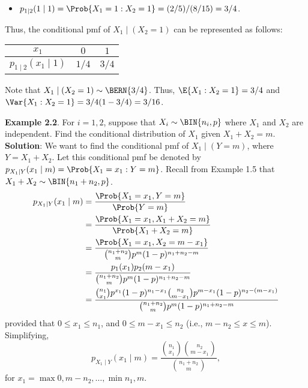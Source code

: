 \begin{Example}
\begin{itemize}
        \item $ p_{1\mid 2}(1\mid 1)=\Prob{X_1=1\given X_2=1}=(2/5)/(8/15)=3/4 $.
    \end{itemize}
    Thus, the conditional pmf of $ X_1\mid(X_2=1) $ can be
    represented as follows:
    \begin{center}
        \begin{NiceTabular}{c|cc}
            $ x_1 $ & $ 0 $ & $ 1 $\\
            \midrule
            $ p_{1\mid 2}(x_1\mid 1) $ & $ 1/4 $ & $ 3/4 $
        \end{NiceTabular}
    \end{center}
    Note that $ X_1\mid (X_2=1)\sim \BERN{3/4} $. Thus, $ \E{X_1\given X_2=1}=3/4 $ and $ \Var{X_1\given X_2=1}=3/4(1-3/4)=3/16 $.
\end{Example}
\begin{Example}
    \textbf{Example 2.2}. For $ i=1,2 $, suppose that $ X_i \sim \BIN{n_i,p} $ where $ X_1 $ and $ X_2 $ are independent. Find the
    conditional distribution of $ X_1 $ given $ X_1+X_2=m $.
    \tcblower{}
    \textbf{Solution}: We want to find the conditional pmf of $ X_1\mid (Y=m) $, where $ Y=X_1+X_2 $. Let this conditional
    pmf be denoted by $ p_{X_1\mid Y}(x_1\mid m)=\Prob{X_1=x_1\given Y=m} $.
    Recall from Example 1.5 that $ X_1+X_2 \sim \BIN{n_1+n_2,p} $.
    \begin{align*}
        p_{X_1\mid Y}(x_1\mid m)
         & =\frac{\Prob{X_1=x_1,Y=m}}{\Prob{Y=m}}                                                                                               \\
         & =\frac{\Prob{X_1=x_1,X_1+X_2=m}}{\Prob{X_1+X_2=m}}                                                                                   \\
         & =\frac{\Prob{X_1=x_1,X_2=m-x_1}}{\binom{n_1+n_2}{m}p^m (1-p)^{n_1+n_2-m}}                                                            \\
         & =\frac{p_1(x_1)p_2(m-x_1)}{\binom{n_1+n_2}{m}p^m (1-p)^{n_1+n_2-m}}                                                                  \\
         & =\frac{\binom{n_1}{x_1}p^{x_1}(1-p)^{n_1-x_1}\binom{n_2}{m-x_1}p^{m-x_1}(1-p)^{n_2-(m-x_1)}}{\binom{n_1+n_2}{m}p^m(1-p)^{n_1+n_2-m}}
    \end{align*}
    provided that $ 0\le x_1\le n_1 $, and $ 0\le m-x_1\le n_2 $ (i.e., $ m-n_2\le x\le m $). Simplifying,
    \[p_{X_1\mid Y}(x_1\mid m)=\frac{\binom{n_1}{x_1}\binom{n_2}{m-x_1}}{\binom{n_1+n_2}{m}},\]
    for $ x_1=\max{0,m-n_2},\ldots,\min{n_1,m} $.
\end{Example}
